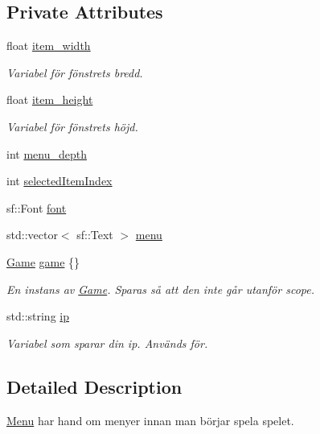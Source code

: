 \subsection*{Private Attributes}
\begin{DoxyCompactItemize}
\item 
float \hyperlink{classMenu_a8dd7434d066c508cb0bc6b7a16d3896c}{item\+\_\+width}
\begin{DoxyCompactList}\small\item\em Variabel för fönstrets bredd. \end{DoxyCompactList}\item 
float \hyperlink{classMenu_a715ee3491fe1a3f34061a5a17ef4871e}{item\+\_\+height}
\begin{DoxyCompactList}\small\item\em Variabel för fönstrets höjd. \end{DoxyCompactList}\item 
int \hyperlink{classMenu_a0b9b3614aefa98bd42a9c54984784f15}{menu\+\_\+depth}
\item 
int \hyperlink{classMenu_a464ef16fd28c0df35ee1d9f78c0ef895}{selected\+Item\+Index}
\item 
sf\+::\+Font \hyperlink{classMenu_a9446727ebf60c6063218b5d4bcae170a}{font}
\item 
std\+::vector$<$ sf\+::\+Text $>$ \hyperlink{classMenu_ae0638a87425d6d01ce8b5c3508e4a642}{menu}
\item 
\hyperlink{classGame}{Game} \hyperlink{classMenu_a600e0c5a79a2200f64d7c3d5626c026d}{game} \{\}
\begin{DoxyCompactList}\small\item\em En instans av \hyperlink{classGame}{Game}. Sparas så att den inte går utanför scope. \end{DoxyCompactList}\item 
std\+::string \hyperlink{classMenu_ae225c68be6780e064e5f1e6f57d68d5e}{ip}
\begin{DoxyCompactList}\small\item\em Variabel som sparar din ip. Används för. \end{DoxyCompactList}\end{DoxyCompactItemize}


\subsection{Detailed Description}
\hyperlink{classMenu}{Menu} har hand om menyer innan man börjar spela spelet. 

